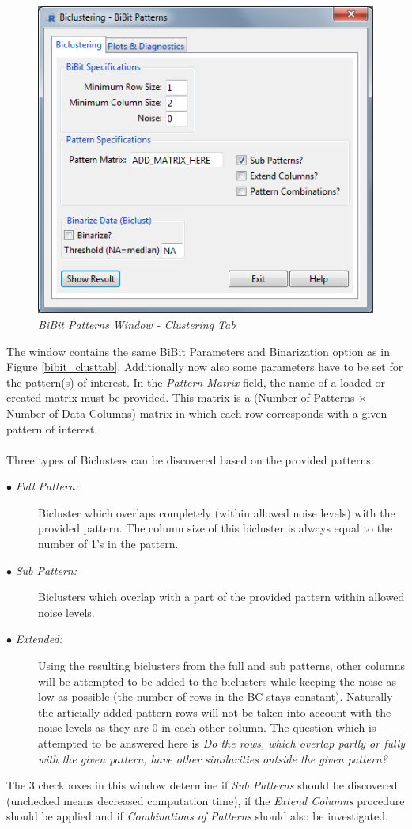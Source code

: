 \documentclass[a4paper]{article}\usepackage[]{graphicx}\usepackage[]{color}
\begin{document}
\begin{figure}[H]
\centering
\includegraphics[scale=0.5]{figures/bibit3_clusttab.png}
\caption{{\it BiBit Patterns Window - Clustering Tab}\label{bibit3_clusttab}}
\end{figure}

\noindent The window contains the same BiBit Parameters and Binarization option
as in Figure \ref{bibit_clusttab}. Additionally now also some parameters have to be set for
the pattern(s) of interest. In the {\it Pattern Matrix} field, the name of a
loaded or created matrix must be provided. This matrix is a (Number of Patterns
$\times$ Number of Data Columns) matrix in which each row corresponds with a given pattern of interest.
\\ \\
Three types of Biclusters can be discovered based on the provided patterns:
\begin{description}
\item[$\bullet$ {\it Full Pattern: }]Bicluster which overlaps completely (within allowed noise levels) with the provided pattern. The column size of this bicluster is always equal to the number of 1's in the pattern.
\item[$\bullet$ {\it Sub Pattern: }]Biclusters which overlap with a part of the
provided pattern within allowed noise levels. 
\item[$\bullet$ {\it Extended: }]Using the resulting biclusters from the full and sub patterns, other columns will be attempted to be added to the biclusters while keeping the noise as low as possible (the number of rows in the BC stays constant). Naturally the articially added pattern rows will not be taken into account with the noise levels as they are 0 in each other column. 
The question which is attempted to be answered here is {\it Do the rows, which
overlap partly or fully with the given pattern, have other similarities outside
the given pattern?}
\end{description}
\noindent The 3 checkboxes in this window determine if {\it Sub Patterns} should
be discovered (unchecked means decreased computation time), if the {\it Extend
Columns} procedure should be applied and if {\it Combinations of Patterns}
should also be investigated.
\end{document}
